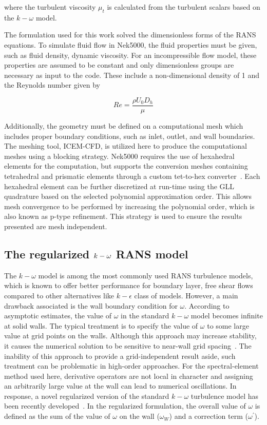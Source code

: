 where the turbulent viscosity $\mu_t$ is calculated from the turbulent scalars based on the $k-\omega$ model. 
 
The formulation used for this work solved the dimensionless forms of the RANS equations. To simulate fluid flow in Nek5000, the fluid properties must be given, such as fluid density, dynamic viscosity. For an incompressible flow model, these properties are assumed to be constant and only dimensionless groups are necessary as input to the code. These include a non-dimensional density of 1 and the Reynolds number given by

\begin{equation}
    Re = \frac{\rho U_0 D_h}{\mu}
\end{equation}

Additionally, the geometry must be defined on a computational mesh which includes proper boundary conditions, such as inlet, outlet, and wall boundaries. The meshing tool, ICEM-CFD, is utilized here to produce the computational meshes using a blocking strategy. Nek5000 requires the use of hexahedral elements for the computation, but supports the conversion meshes containing tetrahedral and prismatic elements through a custom tet-to-hex converter~\citep{Yuan2020}. Each hexahedral element can be further discretized at run-time using the GLL quadrature based on the selected polynomial approximation order. This allows mesh convergence to be performed by increasing the polynomial order, which is also known as p-type refinement. This strategy is used to ensure the results presented are mesh independent. 

\subsection{The regularized $\lowercase{k}-\omega$ RANS model}
\label{sec:nek2}

The $k-\omega$ model is among the most commonly used RANS turbulence models, which is known to offer better performance for boundary layer, free shear flows compared to other alternatives like $k-\epsilon$ class of models. However, a main drawback associated is the wall boundary condition for $\omega$. According to asymptotic estimates, the value of $\omega$ in the standard $k-\omega$ model becomes infinite at solid walls. The typical treatment is to specify the value of $\omega$ to some large value at grid points on the walls. Although this approach may increase stability, it causes the numerical solution to be sensitive to near-wall grid spacing~\citep{Wilcox1998}. The inability of this approach to provide a grid-independent result aside, such treatment can be problematic in high-order approaches. For the spectral-element method used here, derivative operators are not local in character and assigning an arbitrarily large value at the wall can lead to numerical oscillations. In response, a novel regularized version of the standard $k-\omega$ turbulence model has been recently developed~\citep{Tomboulides2018}. In the regularized formulation, the overall value of $\omega$ is defined as the sum of the value of $\omega$ on the wall ($\omega_W$) and a correction term ($\omega^\prime$). 

